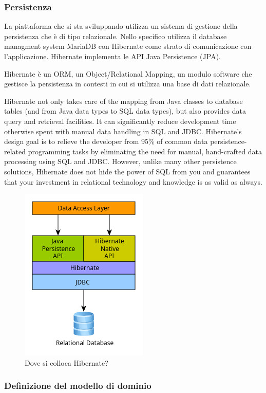 \documentclass[a4paper,11pt]{article}
\begin{document}
\subsubsection{Persistenza}

La piattaforma che si sta sviluppando utilizza un sistema di gestione della persistenza che è di tipo relazionale. Nello specifico utilizza il database managment system MariaDB con Hibernate come strato di comunicazione con l'applicazione. Hibernate implementa le API Java Persistence (JPA).

Hibernate è un ORM, un Object/Relational Mapping, un modulo software che gestisce la persistenza in contesti in cui si utilizza una base di dati relazionale.

Hibernate not only takes care of the mapping from Java classes to database tables (and from Java data types to SQL data types), but also provides data query and retrieval facilities. It can significantly reduce development time otherwise spent with manual data handling in SQL and JDBC. Hibernate’s design goal is to relieve the developer from 95\% of common data persistence-related programming tasks by eliminating the need for manual, hand-crafted data processing using SQL and JDBC. However, unlike many other persistence solutions, Hibernate does not hide the power of SQL from you and guarantees that your investment in relational technology and knowledge is as valid as always. \cite{jbossHibernateUser}

\begin{figure}[H]
  \centering
  \includegraphics[width=0.4\linewidth]{img/image-3.png}
  \caption{Dove si colloca Hibernate? \cite{jbossHibernateUserArch}}
  \label{fig:architetturahibernate}
\end{figure}


\subsubsection{Definizione del modello di dominio}\label{modellodominio}
\end{document}
